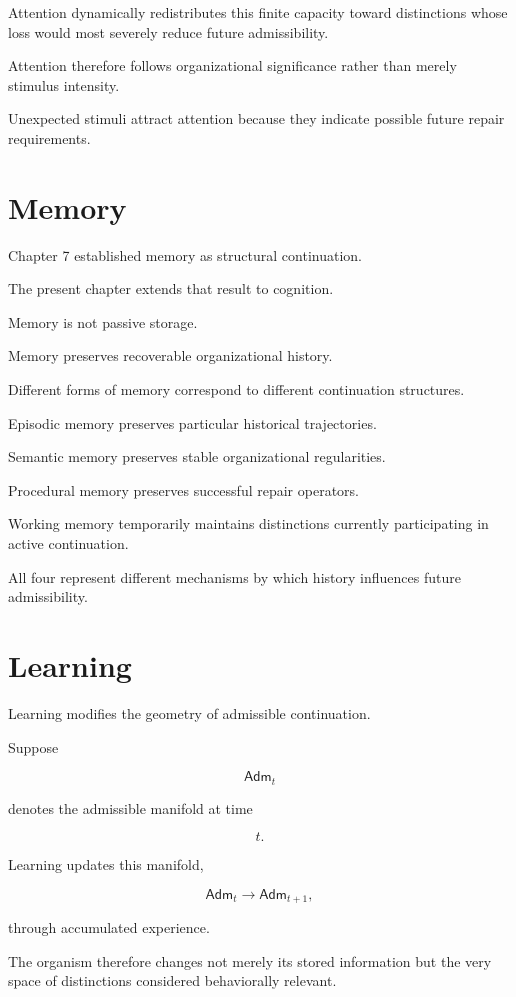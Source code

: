 \documentclass[11pt,oneside]{book}
\numberwithin{equation}{chapter}
\theoremstyle{definition}
\theoremstyle{plain}
\newcommand{\Adm}{\mathsf{Adm}}
\begin{document}
Attention dynamically redistributes this finite capacity toward
distinctions whose loss would most severely reduce future admissibility.

Attention therefore follows organizational significance rather than merely
stimulus intensity.

Unexpected stimuli attract attention because they indicate possible future
repair requirements.

\section{Memory}

Chapter 7 established memory as structural continuation.

The present chapter extends that result to cognition.

Memory is not passive storage.

Memory preserves recoverable organizational history.

Different forms of memory correspond to different continuation structures.

Episodic memory preserves particular historical trajectories.

Semantic memory preserves stable organizational regularities.

Procedural memory preserves successful repair operators.

Working memory temporarily maintains distinctions currently participating in
active continuation.

All four represent different mechanisms by which history influences future
admissibility.

\section{Learning}

Learning modifies the geometry of admissible continuation.

Suppose

\[
\Adm_t
\]

denotes the admissible manifold at time

\[
t.
\]

Learning updates this manifold,

\[
\Adm_t
\longrightarrow
\Adm_{t+1},
\]

through accumulated experience.

The organism therefore changes not merely its stored information but the
very space of distinctions considered behaviorally relevant.
\end{document}
